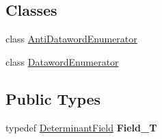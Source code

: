 \subsection*{Classes}
\begin{DoxyCompactItemize}
\item 
class \hyperlink{classDeterminantElement_1_1AntiDatawordEnumerator}{Anti\+Dataword\+Enumerator}
\item 
class \hyperlink{classDeterminantElement_1_1DatawordEnumerator}{Dataword\+Enumerator}
\end{DoxyCompactItemize}
\subsection*{Public Types}
\begin{DoxyCompactItemize}
\item 
typedef \hyperlink{classDeterminantField}{Determinant\+Field} {\bfseries Field\+\_\+T}\hypertarget{classDeterminantElement_a35ba407ecc76258d039bf7ef1bcefe8a}{}\label{classDeterminantElement_a35ba407ecc76258d039bf7ef1bcefe8a}

\end{DoxyCompactItemize}
